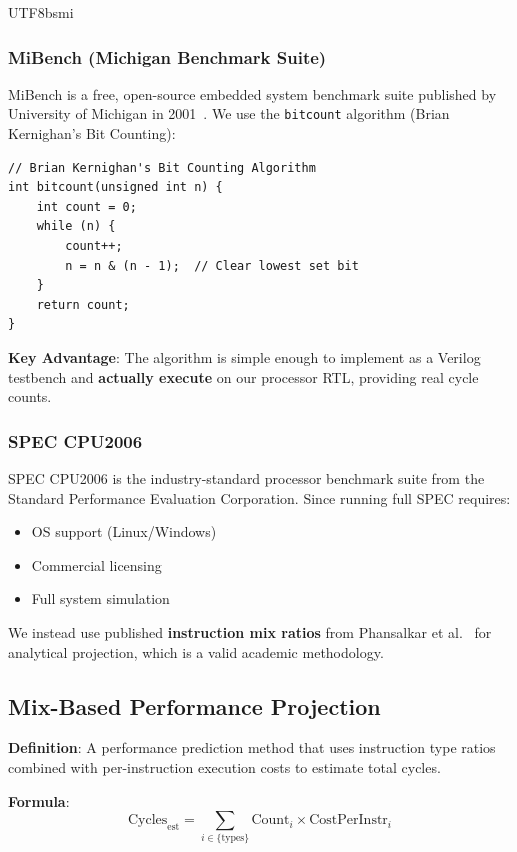 \documentclass[journal,twoside]{IEEEtran}
\begin{document}
\begin{CJK}{UTF8}{bsmi}
\subsubsection{MiBench (Michigan Benchmark Suite)}
MiBench is a free, open-source embedded system benchmark suite published by University of Michigan in 2001~\cite{guthaus2001mibench}. We use the \texttt{bitcount} algorithm (Brian Kernighan's Bit Counting):
\begin{lstlisting}
// Brian Kernighan's Bit Counting Algorithm
int bitcount(unsigned int n) {
    int count = 0;
    while (n) {
        count++;
        n = n & (n - 1);  // Clear lowest set bit
    }
    return count;
}
\end{lstlisting}

\textbf{Key Advantage}: The algorithm is simple enough to implement as a Verilog testbench and \textbf{actually execute} on our processor RTL, providing real cycle counts.

\subsubsection{SPEC CPU2006}
SPEC CPU2006 is the industry-standard processor benchmark suite from the Standard Performance Evaluation Corporation. Since running full SPEC requires:
\begin{itemize}
    \item OS support (Linux/Windows)
    \item Commercial licensing
    \item Full system simulation
\end{itemize}
We instead use published \textbf{instruction mix ratios} from Phansalkar et al.~\cite{phansalkar2007analysis} for analytical projection, which is a valid academic methodology.

\subsection{Mix-Based Performance Projection}
\textbf{Definition}: A performance prediction method that uses instruction type ratios combined with per-instruction execution costs to estimate total cycles.

\textbf{Formula}:
\begin{equation}
\text{Cycles}_{\text{est}} = \sum_{i \in \{\text{types}\}} \text{Count}_i \times \text{CostPerInstr}_i
\label{eq:mixproj}
\end{equation}


\end{CJK}
\end{document}
